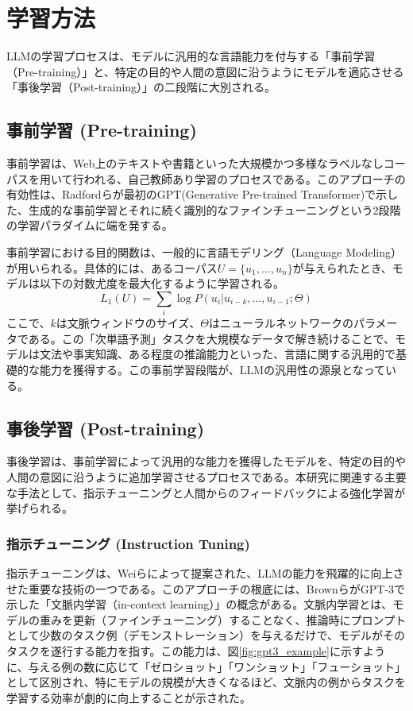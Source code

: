 \documentclass[a4paper,11pt]{jreport}
\begin{document}
\section{学習方法}
LLMの学習プロセスは、モデルに汎用的な言語能力を付与する「事前学習（Pre-training）」と、特定の目的や人間の意図に沿うようにモデルを適応させる「事後学習（Post-training）」の二段階に大別される。

\subsection{事前学習 (Pre-training)}
事前学習は、Web上のテキストや書籍といった大規模かつ多様なラベルなしコーパスを用いて行われる、自己教師あり学習のプロセスである。このアプローチの有効性は、Radfordらが最初のGPT(Generative Pre-trained Transformer)で示した\cite{GPT-1}、生成的な事前学習とそれに続く識別的なファインチューニングという2段階の学習パラダイムに端を発する。

事前学習における目的関数は、一般的に言語モデリング（Language Modeling）が用いられる。具体的には、あるコーパス$U = \{u_1, \dots, u_n\}$が与えられたとき、モデルは以下の対数尤度を最大化するように学習される。
$$
L_1(U) = \sum_i \log P(u_i | u_{i-k}, \dots, u_{i-1}; \Theta)
$$
ここで、$k$は文脈ウィンドウのサイズ、$\Theta$はニューラルネットワークのパラメータである。この「次単語予測」タスクを大規模なデータで解き続けることで、モデルは文法や事実知識、ある程度の推論能力といった、言語に関する汎用的で基礎的な能力を獲得する。この事前学習段階が、LLMの汎用性の源泉となっている。

\subsection{事後学習 (Post-training)}
事後学習は、事前学習によって汎用的な能力を獲得したモデルを、特定の目的や人間の意図に沿うように追加学習させるプロセスである。本研究に関連する主要な手法として、指示チューニングと人間からのフィードバックによる強化学習が挙げられる。

\subsubsection{指示チューニング (Instruction Tuning)}
指示チューニングは、Weiらによって提案された\cite{Instruction-Tuning}、LLMの能力を飛躍的に向上させた重要な技術の一つである。このアプローチの根底には、BrownらがGPT-3で示した「文脈内学習（in-context learning）」の概念がある\cite{GPT-3}。文脈内学習とは、モデルの重みを更新（ファインチューニング）することなく、推論時にプロンプトとして少数のタスク例（デモンストレーション）を与えるだけで、モデルがそのタスクを遂行する能力を指す。この能力は、図\ref{fig:gpt3_example}に示すように、与える例の数に応じて「ゼロショット」「ワンショット」「フューショット」として区別され、特にモデルの規模が大きくなるほど、文脈内の例からタスクを学習する効率が劇的に向上することが示された。
\end{document}
